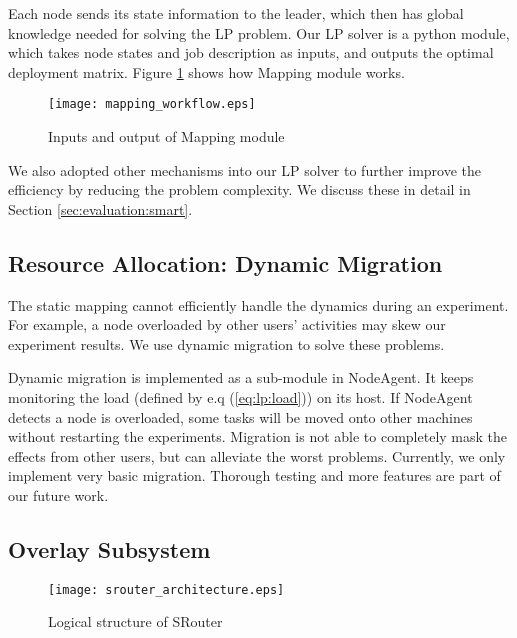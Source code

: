 \documentclass[conference]{IEEEtran}
\begin{document}
Each node sends its state information to the leader, which then has
global knowledge needed for solving the LP problem. Our LP solver is a
python module, which takes node states and job description as inputs,
and outputs the optimal deployment matrix. Figure
\ref{sec:architecture:mapping} shows how Mapping module works.

\begin{figure}[!tb]
  \centering
  \texttt{[image: mapping\_workflow.eps]}
  \caption{Inputs and output of Mapping module}
  \label{sec:architecture:mapping}
\end{figure}

We also adopted other mechanisms into our LP solver to further improve
the efficiency by reducing the problem complexity. We discuss these in
detail in Section \ref{sec:evaluation:smart}.




\subsection{Resource Allocation: Dynamic Migration}
\label{sec:architecture:allocation:migration}

The static mapping cannot efficiently handle the dynamics during an
experiment.  For example, a node overloaded by other users' activities
may skew our experiment results. We use dynamic migration to solve
these problems.

Dynamic migration is implemented as a sub-module in NodeAgent. It
keeps monitoring the load (defined by e.q (\ref{eq:lp:load})) on its
host.  If NodeAgent detects a node is overloaded, some tasks will be
moved onto other machines without restarting the
experiments. Migration is not able to completely mask the effects from
other users, but can alleviate the worst problems. Currently, we only
implement very basic migration. Thorough testing and more features are
part of our future work.


\subsection{Overlay Subsystem}
\label{sec:architecture:overlay}

\begin{figure}[!tb]
  \centering
  \texttt{[image: srouter\_architecture.eps]}
  \caption{Logical structure of SRouter}
  \label{sec:architecture:srouter_architecture}
  \vskip -5mm
\end{figure}
\end{document}
